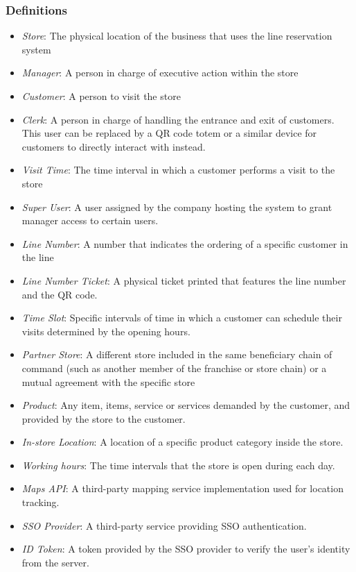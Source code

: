 \subsubsection{Definitions}
\begin{itemize}
    \item \textit{Store}: The physical location of the business that uses the line reservation system
    \item \textit{Manager}: A person in charge of executive action within the store
    \item \textit{Customer}: A person to visit the store
    \item \textit{Clerk}: A person in charge of handling the entrance and exit of customers. This user can be replaced by a QR code totem or a similar device for customers to directly interact with instead.
    \item \textit{Visit Time}: The time interval in which a customer performs a visit to the store
    \item \textit{Super User}: A user assigned by the company hosting the system to grant manager access to certain users.
    \item \textit{Line Number}: A number that indicates the ordering of a specific customer in the line %
    \item \textit{Line Number Ticket}: A physical ticket printed that features the line number and the QR code.
    \item \textit{Time Slot}: Specific intervals of time in which a customer can schedule their visits determined by the opening hours.
    \item \textit{Partner Store}: A different store included in the same beneficiary chain of command (such as another member of the franchise or store chain) or a mutual agreement with the specific store
    \item \textit{Product}: Any item, items, service or services demanded by the customer, and provided by the store to the customer.
    \item \textit{In-store Location}: A location of a specific product category inside the store.
    \item \textit{Working hours}: The time intervals that the store is open during each day.
    \item \textit{Maps API}: A third-party mapping service implementation used for location tracking.
    \item \textit{SSO Provider}: A third-party service providing SSO authentication.
    \item \textit{ID Token}: A token provided by the SSO provider to verify the user's identity from the server.
\end{itemize}
